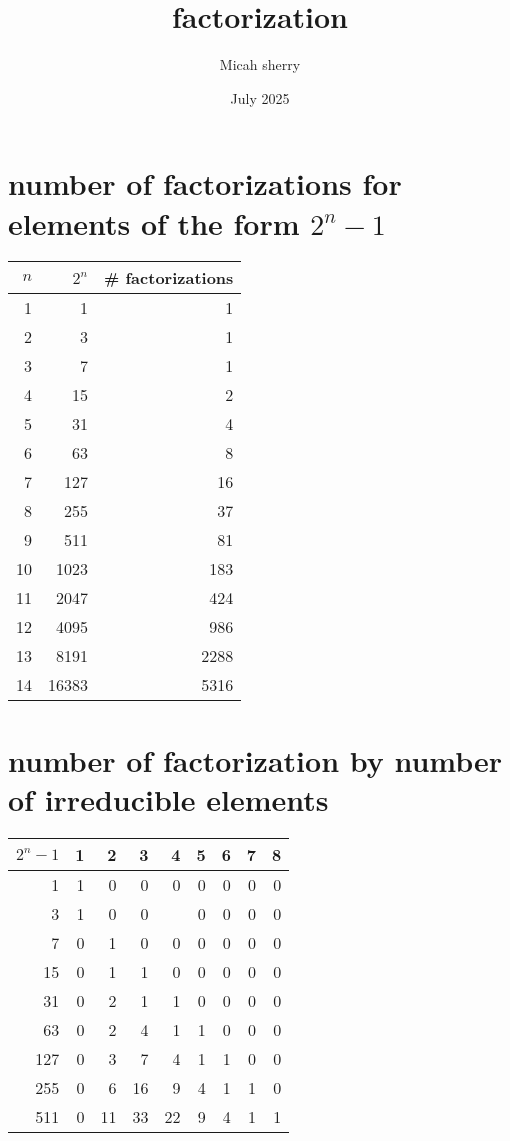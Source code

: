\documentclass{article}
\title{factorization }
\author{Micah sherry}
\date{July 2025}
\begin{document}
\section*{number of factorizations for elements of the form $2^n-1$}

\begin{center} 
    \begin{tabular}{|r|r|r|}
        \hline
        $n$ & $2^n$ & \# factorizations \\ \hline
        1 & 1 & 1 \\ \hline
        2 & 3 & 1 \\ \hline 
        3 & 7 & 1 \\ \hline 
        4 & 15 & 2 \\ \hline 
        5 & 31 & 4 \\ \hline 
        6 & 63 & 8 \\ \hline 
        7 & 127 & 16 \\ \hline 
        8 & 255 & 37 \\ \hline 
        9 & 511 & 81 \\ \hline 
        10 & 1023 & 183 \\ \hline 
        11 & 2047 & 424 \\ \hline 
        12 & 4095 & 986 \\ \hline 
        13 & 8191 & 2288 \\ \hline 
        14 & 16383 & 5316 \\ \hline 
    \end{tabular}

\end{center}

\section*{number of factorization by number of irreducible elements}
\begin{center} 
    \begin{tabular}{|r||r|r|r|r|r|r|r|r|} 
        \hline
        $2^n-1$ & 1  & 2  & 3  & 4  & 5  & 6  & 7  & 8  \\ \hline\hline
            1   & 1  & 0  & 0  & 0  & 0  & 0  & 0  & 0  \\ \hline
            3   & 1  & 0  & 0  &   & 0  & 0  & 0  & 0  \\ \hline
            7   & 0  & 1  & 0  & 0  & 0  & 0  & 0  & 0  \\ \hline
            15  & 0  & 1  & 1  & 0  & 0  & 0  & 0  & 0  \\ \hline
            31  & 0  & 2  & 1  & 1  & 0  & 0  & 0  & 0  \\ \hline
            63  & 0  & 2  & 4  & 1  & 1  & 0  & 0  & 0  \\ \hline
            127 & 0  & 3  & 7  & 4  & 1  & 1  & 0  & 0  \\ \hline
            255 & 0  & 6  & 16 & 9  & 4  & 1  & 1  & 0  \\ \hline
            511 & 0  & 11 & 33 & 22 & 9  & 4  & 1  & 1  \\ \hline
        
    \end{tabular}
\end{center}
\end{document}
